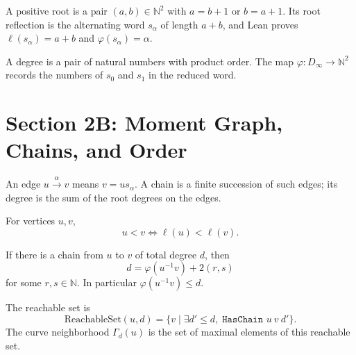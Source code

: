 \begin{definition}\label{root_def}
  \leanok
  A positive root is a pair $(a,b)\in\mathbb N^2$ with $a=b+1$ or $b=a+1$.
  Its root reflection is the alternating word $s_\alpha$ of length $a+b$, and
  Lean proves $\ell(s_\alpha)=a+b$ and $\varphi(s_\alpha)=\alpha$.
\end{definition}

\begin{definition}\label{degree_def}
  \leanok
  A degree is a pair of natural numbers with product order.  The map
  $\varphi : D_\infty\to\mathbb N^2$ records the numbers of $s_0$ and $s_1$ in
  the reduced word.
\end{definition}

\chapter{Section 2B: Moment Graph, Chains, and Order}

\begin{definition}\label{chain_def}
  \leanok
  An edge $u\xrightarrow{\alpha}v$ means $v=u s_\alpha$.  A chain is a finite
  succession of such edges; its degree is the sum of the root degrees on the
  edges.
\end{definition}

\begin{theorem}\label{lt_iff_length_lt}
  \leanok
  For vertices $u,v$,
  \[
    u<v \iff \ell(u)<\ell(v).
  \]
\end{theorem}

\begin{lemma}\label{lemma_2_5}
  \leanok
  If there is a chain from $u$ to $v$ of total degree $d$, then
  \[
    d=\varphi(u^{-1}v)+2(r,s)
  \]
  for some $r,s\in\mathbb N$.  In particular $\varphi(u^{-1}v)\le d$.
\end{lemma}

\begin{definition}\label{curve_nbhd_def}
  \leanok
  The reachable set is
  \[
    \mathrm{ReachableSet}(u,d)=\{v\mid \exists d'\le d,\;\texttt{HasChain }u\ v\ d'\}.
  \]
  The curve neighborhood $\Gamma_d(u)$ is the set of maximal elements of this
  reachable set.
\end{definition}

